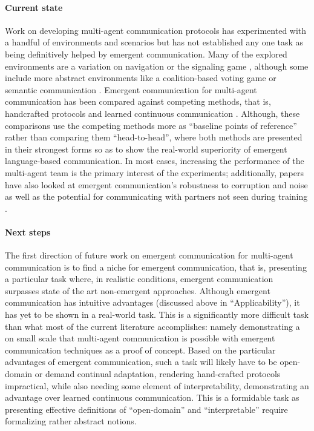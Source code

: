 \paragraph{Current state}
Work on developing multi-agent communication protocols has experimented with a handful of environments and scenarios but has not established any one task as being definitively helped by emergent communication.
Many of the explored environments are a variation on
    navigation \citep{mul2019mastering,Li2022LearningED,masquil2022intrinsically}
    or the signaling game \citep{bullard2021quasi,cope2021learning,wang2022emergence,Tucker2021EmergentDC},
    although some include more abstract environments like a coalition-based voting game \citep{Li2022LearningED} or semantic communication \citep{thomas2022neuro}.
Emergent communication for multi-agent communication has been compared against competing methods, that is, handcrafted protocols \citep{Gupta2020NetworkedMR,Chen2022DeepRL} and learned continuous communication \citep{Li2022LearningED,wang2022emergence}.
  Although, these comparisons use the competing methods more as ``baseline points of reference'' rather than comparing them ``head-to-head'', where both methods are presented in their strongest forms so as to show the real-world superiority of emergent language-based communication.
In most cases, increasing the performance of the multi-agent team is the primary interest of the experiments; additionally, papers have also looked at emergent communication's robustness to corruption and noise \citep{cope2021learning,wang2022emergence} as well as the potential for communicating with partners not seen during training \citep{bullard2021quasi,cope2021learning}.

\paragraph{Next steps}
The first direction of future work on emergent communication for multi-agent communication is to find a niche for emergent communication, that is, presenting a particular task where, in realistic conditions, emergent communication surpasses state of the art non-emergent approaches.
Although emergent communication has intuitive advantages (discussed above in ``Applicability''), it has yet to be shown in a real-world task.
This is a significantly more difficult task than what most of the current literature accomplishes: namely demonstrating a on small scale that multi-agent communication is possible with emergent communication techniques as a proof of concept.
Based on the particular advantages of emergent communication, such a task will likely have to be open-domain or demand continual adaptation, rendering hand-crafted protocols impractical, while also needing some element of interpretability, demonstrating an advantage over learned continuous communication.
This is a formidable task as presenting effective definitions of ``open-domain'' and ``interpretable'' require formalizing rather abstract notions.


